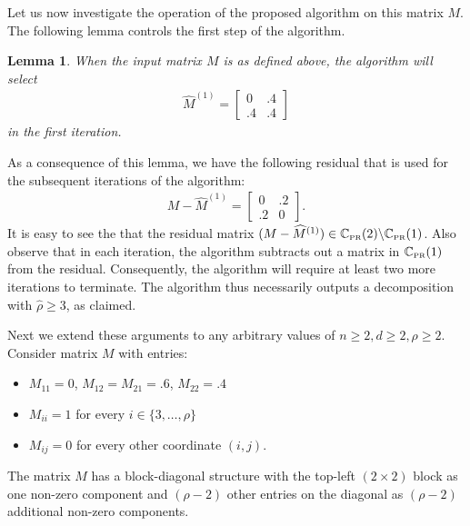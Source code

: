 \documentclass[11pt, hidelinks]{article} %
\newtheorem{lemma}{Lemma}
\newcommand{\numrows}{n}
\newcommand{\numcols}{d}
\newcommand{\wtmatrix}{M}
\newcommand{\wt}{\wtmatrix}
\newcommand{\matrixset}{\mathbb{C}}
\newcommand{\wthat}{\widehat{\wtmatrix}}
\newcommand{\permset}{\matrixset_{\mbox{\tiny PR}}}
\newcommand{\permrank}{\rho}
\begin{document}
Let us now investigate the operation of the proposed algorithm on this
matrix $\wt$. The following lemma controls the first step of the
algorithm.
\begin{lemma}
  \label{LemGreedyDecompStep1}
When the input matrix $\wt$ is as defined above, the algorithm will
select
\begin{align*}
\wthat^{(1)} =
\begin{bmatrix}
0 & .4 \\ .4 & .4
\end{bmatrix}
\end{align*}
in the first iteration.
\end{lemma}

As a consequence of this lemma, we have the following residual that is
used for the subsequent iterations of the algorithm:
\begin{align*}
\wt - \wthat^{(1)} = 
\begin{bmatrix}
0 & .2 \\ .2 & 0
\end{bmatrix}.
\end{align*}
It is easy to see the that the residual matrix $(\wt - \wthat^{(1)}) \in \permset(2)
\backslash \permset(1)$. Also observe that in each iteration, the algorithm subtracts out a matrix in
$\permset(1)$ from the residual. Consequently, the algorithm will
require at least two more iterations to terminate. %
The algorithm thus necessarily outputs a decomposition with $\widehat{\permrank} \geq 3$, as claimed.

Next we extend these arguments to any arbitrary
values of $\numrows \geq 2, \numcols \geq 2, \permrank \geq
2$. Consider matrix $\wt$ with entries:
\begin{itemize}
	\itemsep0em
\item $\wt_{11} = 0$, $\wt_{12} = \wt_{21} = .6$, $\wt_{22} = .4$
%	
\item $\wt_{ii} = 1$ for every $i \in \{3, \ldots, \permrank\}$
%	
\item $\wt_{ij} = 0$ for every other coordinate $(i,j)$.
\end{itemize} 
The matrix $\wt$ has a block-diagonal structure with the top-left $(2
\times 2)$ block as one non-zero component and $(\permrank - 2)$ other
entries on the diagonal as $(\permrank - 2)$ additional non-zero
components. 
\end{document}
